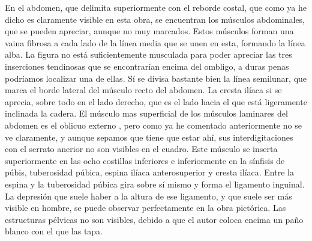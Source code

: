 En el abdomen, que delimita superiormente con el reborde costal, que como ya he dicho es claramente visible en esta obra, se encuentran los músculos abdominales, que se pueden apreciar, aunque no muy marcados. Estos músculos forman una vaina fibrosa a cada lado de la línea media que se unen en esta, formando la línea alba. La figura no está suficientemente musculada para poder apreciar las tres inserciones tendinosas que se encontrarían encima del ombligo, a duras penas podríamos localizar una de ellas. Sí se divisa bastante bien la línea semilunar, que marca el borde lateral del músculo recto del abdomen. La cresta ilíaca si se aprecia, sobre todo en el lado derecho, que es el lado hacia el que está ligeramente inclinada la cadera.
El músculo mas superficial de los músculos laminares del abdomen es el oblicuo externo , pero como ya he comentado anteriormente no se ve claramente, y aunque sepamos que tiene que estar ahí, sus interdigitaciones con el serrato anerior no son visibles en el cuadro. Este músculo se inserta superiormente en las ocho costillas inferiores e inferiormente en la sínfisis de púbis, tuberosidad púbica, espina ilíaca anterosuperior y cresta ilíaca. Entre la espina y la tuberosidad púbica gira sobre sí mismo y forma el ligamento inguinal. La depresión que suele haber a la altura de ese ligamento, y que suele ser más visible en hombre, se puede observar perfectamente en la obra pictórica.
Las estructuras pélvicas no son visibles, debido a que el autor coloca encima un paño blanco con el que las tapa.

